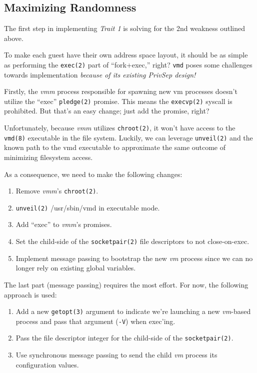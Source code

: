 \documentclass[conference]{IEEEtran}
\begin{document}
\vspace{3mm}
\subsection{Maximizing Randomness}
\label{sec:randomness}
The first step in implementing \emph{Trait 1} is solving for the 2nd
weakness outlined above.

To make each guest have their own address space layout, it should be
as simple as performing the \texttt{exec(2)} part of ``fork+exec,''
right? \texttt{vmd} poses some challenges towards implementation
\emph{because of its existing PrivSep design!}

Firstly, the \emph{vmm} process responsible for spawning new vm
processes doesn't utilize the ``exec'' \texttt{pledge(2)}
promise. This means the \texttt{execvp(2)} syscall is prohibited. But
that's an easy change; just add the promise, right?

Unfortunately, because \emph{vmm} utilizes \texttt{chroot(2)}, it
won't have access to the \texttt{vmd(8)} executable in the file
system. Luckily, we can leverage \texttt{unveil(2)} and the known path
to the vmd executable to approximate the same outcome of minimizing
filesystem access.

As a consequence, we need to make the following changes:

\vspace{2mm}
\begin{enumerate}
\item Remove \emph{vmm}'s \texttt{chroot(2)}.
\item \texttt{unveil(2)} /usr/sbin/vmd in executable mode.
\item Add ``exec'' to \emph{vmm}'s promises.
\item Set the child-side of the \texttt{socketpair(2)} file
  descriptors to not close-on-exec.
\item Implement message passing to bootstrap the new \emph{vm} process
  since we can no longer rely on existing global variables.
\end{enumerate}
\vspace{2mm}

The last part (message passing) requires the most effort. For now, the
following approach is used:

\vspace{2mm}
\begin{enumerate}
\item Add a new \texttt{getopt(3)} argument to indicate we're
  launching a new \emph{vm}-based process and pass that argument
  (\texttt{-V}) when exec'ing.
\item Pass the file descriptor integer for the child-side of the
  \texttt{socketpair(2)}.
\item Use synchronous message passing to send the child \emph{vm}
  process its configuration values.
\end{enumerate}
\vspace{2mm}
\end{document}
